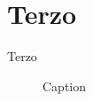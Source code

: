\chapter{Terzo}
Terzo

\begin{figure}[h]
    \centering
    
    \caption{Caption}
    \label{fig:enter-label}
\end{figure}